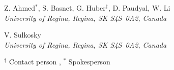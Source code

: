 \documentclass{article}
\begin{document}
\begin{center}
Z. Ahmed$^\ast$, S. Basnet, G. Huber$^\dagger$, D. Paudyal, W. Li  \\
\vspace*{5pt}
{\it University of Regina, Regina, SK S4S~0A2, Canada}
\vspace*{20pt}

V. Sulkosky  \\
\vspace*{5pt}
{\it University of Regina, Regina, SK S4S~0A2, Canada}
\vspace*{20pt}

\end{center}

$^\dagger$ Contact person , $^\ast$ Spokesperson

\vfill\eject

\clearpage



\newpage

\tableofcontents
\end{document}
